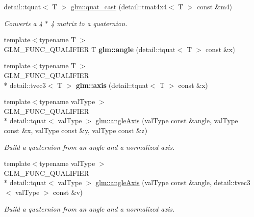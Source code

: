 \begin{DoxyCompactItemize}
detail\-::tquat$<$ T $>$ \hyperlink{group__gtc__quaternion_ga24adafe33b0bcad906c8724a762e5299}{glm\-::quat\-\_\-cast} (detail\-::tmat4x4$<$ T $>$ const \&m4)
\begin{DoxyCompactList}\small\item\em Converts a 4 $\ast$ 4 matrix to a quaternion. \end{DoxyCompactList}\item 
\hypertarget{namespaceglm_a80fd36fde242e1f2de6b3faed774755f}{{\footnotesize template$<$typename T $>$ }\\G\-L\-M\-\_\-\-F\-U\-N\-C\-\_\-\-Q\-U\-A\-L\-I\-F\-I\-E\-R T {\bfseries glm\-::angle} (detail\-::tquat$<$ T $>$ const \&x)}\label{namespaceglm_a80fd36fde242e1f2de6b3faed774755f}

\item 
\hypertarget{namespaceglm_a4103176273d812154bd34d4f697d612d}{{\footnotesize template$<$typename T $>$ }\\G\-L\-M\-\_\-\-F\-U\-N\-C\-\_\-\-Q\-U\-A\-L\-I\-F\-I\-E\-R \\*
detail\-::tvec3$<$ T $>$ {\bfseries glm\-::axis} (detail\-::tquat$<$ T $>$ const \&x)}\label{namespaceglm_a4103176273d812154bd34d4f697d612d}

\item 
{\footnotesize template$<$typename val\-Type $>$ }\\G\-L\-M\-\_\-\-F\-U\-N\-C\-\_\-\-Q\-U\-A\-L\-I\-F\-I\-E\-R \\*
detail\-::tquat$<$ val\-Type $>$ \hyperlink{group__gtc__quaternion_gaafc03953867e42a39dc08575ad4532ad}{glm\-::angle\-Axis} (val\-Type const \&angle, val\-Type const \&x, val\-Type const \&y, val\-Type const \&z)
\begin{DoxyCompactList}\small\item\em Build a quaternion from an angle and a normalized axis. \end{DoxyCompactList}\item 
{\footnotesize template$<$typename val\-Type $>$ }\\G\-L\-M\-\_\-\-F\-U\-N\-C\-\_\-\-Q\-U\-A\-L\-I\-F\-I\-E\-R \\*
detail\-::tquat$<$ val\-Type $>$ \hyperlink{group__gtc__quaternion_ga30071b5b9773087b7212a5ce67d0d90a}{glm\-::angle\-Axis} (val\-Type const \&angle, detail\-::tvec3$<$ val\-Type $>$ const \&v)
\begin{DoxyCompactList}\small\item\em Build a quaternion from an angle and a normalized axis. \end{DoxyCompactList}\end{DoxyCompactItemize}


